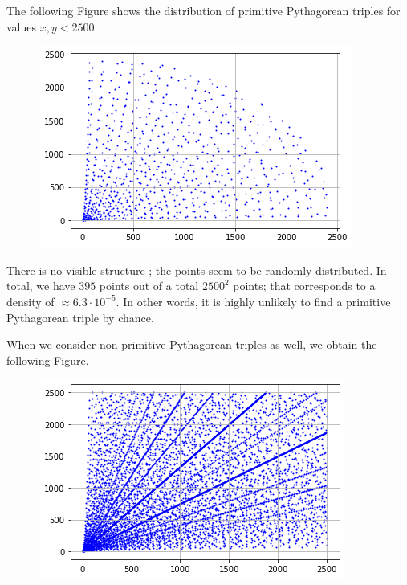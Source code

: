 
The following Figure shows the distribution of primitive Pythagorean triples for values $x, y < 2500$.

\begin{figure}[H]
    \centering
    \includegraphics[scale=0.75]{images/2023-03-28-triples_2.png}
\end{figure}

There is no visible structure ; the points seem to be randomly distributed. In total, we have $395$ points out of a total $2500^2$ points; that corresponds to a density of $\approx 6.3 \cdot 10^{-5}$. In other words, it is highly unlikely to find a primitive Pythagorean triple by chance.

When we consider non-primitive Pythagorean triples as well, we obtain the following Figure.

\begin{figure}[H]
    \centering
    \includegraphics[scale=0.75]{images/2023-03-28-triples_3.png}
\end{figure}

